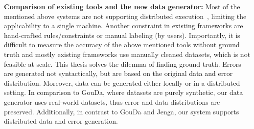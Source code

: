 
\textbf{Comparison of existing tools and the new data generator:} 
Most of the mentioned above systems are not supporting distributed execution~\cite{raha, baran, RekatsinasCIR2017, HeidariMIR2019, RestatGCS2022, jenga}, limiting the applicability to a single machine.
Another constraint in existing frameworks are hand-crafted rules/constraints or manual labeling (by users).
Importantly, it is difficult to measure the accuracy of the above mentioned tools without ground truth and mostly existing frameworks use manually cleaned datasets, which is not feasible at scale.
This thesis solves the dilemma of finding ground truth.
Errors are generated not syntactically, but are based on the original data and error distribution.
Moreover, data can be generated either locally or in a distributed setting.
In comparison to GouDa, where datasets are purely synthetic, our data generator uses real-world datasets,
thus error and data distributions are preserved. 
Additionally, in contrast to GouDa and Jenga, our system supports distributed data and error generation.

